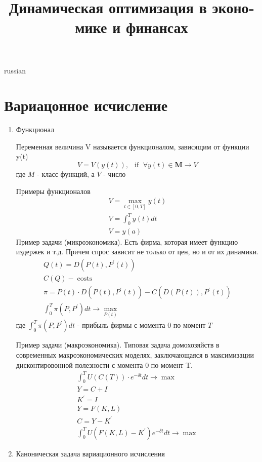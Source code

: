 \documentclass{article}
\begin{document}
\title{\foreignlanguage{russian}{Динамическая оптимизация в экономике и финансах}}
\maketitle

\begin{otherlanguage*}{russian}
\section{\foreignlanguage{russian}{Вариацонное исчисление}}

\begin{enumerate}

\item Функционал

Переменная величина V называется функционалом, зависящим от функции y(t) 	
\begin{equation}
V = V(y(t)), \,\,\, \operatorname{if} \,\, \forall y(t) \in \mathbf{M} \rightarrow V 
\end{equation}
где $M$ - класс функций, а $V$ - число

Примеры функционалов
\begin{align}
V = \max_{t \in [0, T]} y(t) \\
V = \int_{0}^T y(t) dt \\
V = y(a) 
\end{align}
Пример задачи (микроэкономика). Есть фирма, которая имеет функцию издержек и т.д. Причем спрос зависит не только от цен, но и от их динамики. 
\begin{align}
Q(t) = D(P(t), P^{'}(t)) \\
C(Q) - \operatorname{costs} \\
\pi = P(t) \cdot D(P(t), P^{'} (t)) - C(D(P(t)), P^{'}(t)) \\
\int_{0}^T \pi (P, P^{'}) dt \rightarrow \max_{P(t)} 
\end{align}
где $\int_0^T \pi(P, P^{'}) dt$ - прибыль фирмы с момента 0 по момент $T$ 


Пример задачи (макроэкономика). Типовая задача домохозяйств в современных макроэкономических моделях, заключающаяся в максимизации дисконтировонной полезности с момента 0 по момент T. 
\begin{align}
\int_0^T U(C(T)) \cdot e^{-\delta t} dt \rightarrow \max \\
Y = C +  I \\
K^{'} = I \\
Y = F(K, L) \\
C = Y - K^{'} \\
\int_{0}^T U(F(K, L) - K^{'}) e^{-\delta t} dt \rightarrow \max 
\end{align}
\item Каноническая задача вариационного исчисления 


\end{enumerate}
\end{otherlanguage*}
\end{document}
